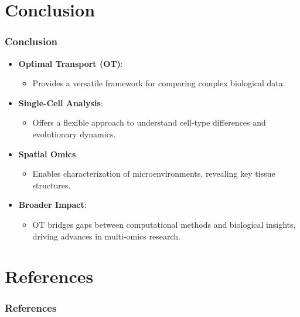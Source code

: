 \documentclass{beamer}
\begin{document}
	\section{Conclusion}
	\begin{frame}
		\frametitle{Conclusion}
		\begin{itemize}
			\item \textbf{Optimal Transport (OT)}:
			\begin{itemize}
				\item Provides a versatile framework for comparing complex biological data.
			\end{itemize}
			
			\item \textbf{Single-Cell Analysis}:
				\begin{itemize}
					\item Offers a flexible approach to understand cell-type differences and evolutionary dynamics.
				\end{itemize}
				
				\item \textbf{Spatial Omics}:
					\begin{itemize}
						\item Enables characterization of microenvironments, revealing key tissue structures.
					\end{itemize}
					
					\item \textbf{Broader Impact}:
						\begin{itemize}
							\item OT bridges gaps between computational methods and biological insights, driving advances in multi-omics research.
						\end{itemize}
					\end{itemize}
				\end{frame}
				
	\section{References}
	\begin{frame}[allowframebreaks]
		\frametitle{References}
		\printbibliography
	\end{frame}
	
\end{document}
